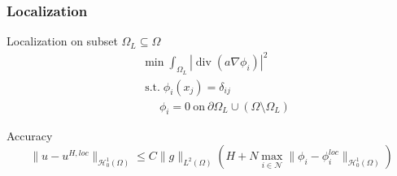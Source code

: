 \documentclass[serif,mathserif, 12pt]{beamer}
\DeclareMathOperator{\ST}{s.t.}
\DeclareMathOperator{\Div}{div}
\begin{document}
\begin{frame}
  \frametitle{Localization}
  \begin{itemize}
     {
  \item Localization on subset $\Omega_L \subseteq \Omega$
    \begin{equation*}
      \begin{split}
      &\min \int_{\Omega_L} |\Div (a\nabla \phi_i) |^2 \\
      &\ST \phi_i(x_j) = \delta_{ij} \\
      &~~~~~~~\phi_i = 0 ~\text{on}~ \partial\Omega_L \cup (\Omega \setminus \Omega_L)
      \end{split}
    \end{equation*}
    }
     {
  \item Accuracy
    \begin{equation*}
      \|u-u^{H, loc}\|_{\mathcal{H}_0^1(\Omega)} \le C\|g\|_{L^2(\Omega)}(H+N\max_{i\in \mathcal{N}}
      \|\phi_i - \phi_i^{loc}\|_{\mathcal{H}^1_0(\Omega)})
    \end{equation*}
    }
  \end{itemize}
\end{frame}
\end{document}
